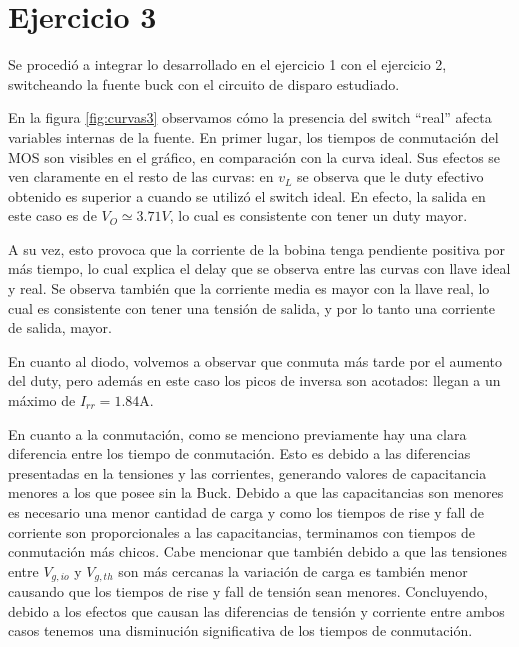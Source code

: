 \documentclass[e4_tp1_main.tex]{subfiles}
\begin{document}
\section{Ejercicio 3}

Se procedi\'o a integrar lo desarrollado en el ejercicio 1 con el ejercicio 2, switcheando la fuente buck con el circuito de disparo estudiado. 

En la figura \ref{fig:curvas3} observamos c\'omo la presencia del switch ``real'' afecta variables internas de la fuente. En primer lugar, los tiempos de conmutaci\'on del MOS son visibles en el gr\'afico, en comparaci\'on con la curva ideal. Sus efectos se ven claramente en el resto de las curvas: en $v_L$ se observa que le duty efectivo obtenido es superior a cuando se utiliz\'o el switch ideal. En efecto, la salida en este caso es de $V_O\simeq3.71V$, lo cual es consistente con tener un duty mayor.

A su vez, esto provoca que la corriente de la bobina tenga pendiente positiva por m\'as tiempo, lo cual explica el delay que se observa entre las curvas con llave ideal y real. Se observa tambi\'en que la corriente media es mayor con la llave real, lo cual es consistente con tener una tensi\'on de salida, y por lo tanto una corriente de salida, mayor.

En cuanto al diodo, volvemos a observar que conmuta m\'as tarde por el aumento del duty, pero adem\'as en este caso los picos de inversa son acotados: llegan a un m\'aximo de $I_{rr}=1.84$A.

En cuanto a la conmutación, como se menciono previamente hay una clara diferencia entre los tiempo de conmutación. Esto es debido a las diferencias presentadas en la tensiones y las corrientes, generando valores de capacitancia menores a los que posee sin la Buck. Debido a que las capacitancias son menores es necesario una menor cantidad de carga y como los tiempos de rise y fall de corriente son proporcionales a las capacitancias, terminamos con tiempos de conmutación más chicos. Cabe mencionar que también debido a que las  tensiones entre $V_{g,io}$ y $V_{g,th}$ son más cercanas la variación de carga es también menor causando que los tiempos de rise y fall de tensión sean menores. Concluyendo, debido a los efectos que causan las diferencias de tensión y corriente entre ambos casos tenemos una disminución significativa de los tiempos de conmutación.
\end{document}
